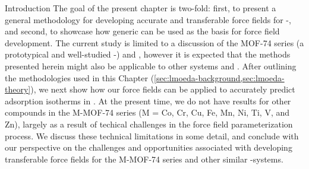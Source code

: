 \begin{section}{Introduction}
The goal of the present chapter is two-fold: first, to present a general 
methodology for developing accurate and transferable force fields for
\cus-\mofs, and second, to showcase how generic \edas can be used as the basis
for force field development.
The current study is limited to a discussion of the MOF-74 series (a
prototypical and well-studied \cus-\mof) and \lmoeda,\cite{Su2009,Chen2010} however it
is expected that the methods presented herein might also be applicable to
other systems and \edas. After outlining the methodologies used in this
Chapter
(\cref{sec:lmoeda-background,sec:lmoeda-theory}), we next show how our force
fields can be applied to accurately predict \co adsorption isotherms in
\mgmof. At the present time, we do not have results for other compounds in the
M-MOF-74 series (M = Co, Cr, Cu, Fe, Mn, Ni, Ti, V, and Zn), largely as a
result of techical challenges in the force field parameterization process.
We discuss these technical limitations in some detail, and conclude with our
perspective on the challenges and opportunities associated with developing
transferable force fields for the M-MOF-74 series and other similar \cus-\mof systems.



\end{section}




